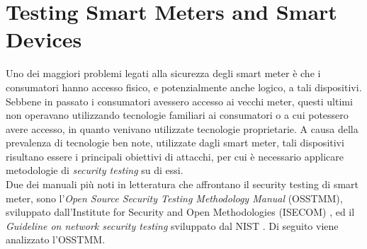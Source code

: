 \section{Testing Smart Meters and Smart Devices}
Uno dei maggiori problemi legati alla sicurezza degli smart meter è che i consumatori hanno accesso fisico, e potenzialmente anche logico, a tali dispositivi. Sebbene in passato i consumatori avessero accesso ai vecchi meter, questi ultimi non operavano utilizzando tecnologie familiari ai consumatori o a cui potessero avere accesso, in quanto venivano utilizzate tecnologie proprietarie. A causa della prevalenza di tecnologie ben note, utilizzate dagli smart meter, tali dispositivi risultano essere i principali obiettivi di attacchi, per cui è necessario applicare metodologie di \emph{security testing} su di essi.\\
Due dei manuali più noti in letteratura che affrontano il security testing di smart meter, sono l'\emph{Open Source Security Testing Methodology Manual} (OSSTMM), sviluppato dall'Institute for Security and Open Methodologies (ISECOM) \cite{osstmm}, ed il \emph{Guideline on network security testing} sviluppato dal NIST \cite{nistguideline}. Di seguito viene analizzato l'OSSTMM.

